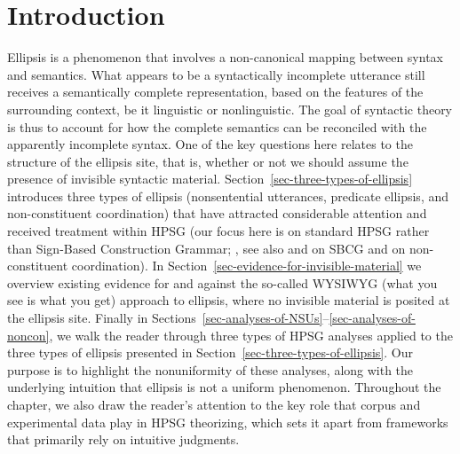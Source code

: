 
\maketitle
\label{chap-ellipsis}



\section{Introduction}
\label{ellipsis-sec-introduction}

Ellipsis is a phenomenon that involves a non-canonical mapping between syntax and semantics. What
appears to be a syntactically incomplete utterance still receives a semantically complete
representation, based on the features of the surrounding context, be it linguistic or
nonlinguistic. The goal of syntactic theory is thus to account for how the complete semantics can be
reconciled with the apparently incomplete syntax. One of the key questions here relates to the
structure of the ellipsis site, that is, whether or not we should assume the presence of invisible
syntactic material. Section~\ref{sec-three-types-of-ellipsis} introduces three types of ellipsis
(nonsentential utterances, predicate ellipsis, and non-constituent coordination) that have attracted
considerable attention and received treatment within HPSG (our focus here is on standard HPSG rather
than Sign-Based Construction Grammar; \citealt{Sag2012}, see also
 and
 on SBCG and
 on non-constituent
coordination).  In Section~\ref{sec-evidence-for-invisible-material} we overview existing evidence
for and against the so-called WYSIWYG (what you see is what you get) approach to ellipsis, where no
invisible material is posited at the ellipsis site. Finally in
Sections~\ref{sec-analyses-of-NSUs}--\ref{sec-analyses-of-noncon}, we walk the reader through three
types of HPSG analyses applied to the three types of ellipsis presented in
Section~\ref{sec-three-types-of-ellipsis}. Our purpose is to highlight the nonuniformity of these
analyses, along with the underlying intuition that ellipsis is not a uniform phenomenon. Throughout
the chapter, we also draw the reader's attention to the key role that corpus and experimental data
play in HPSG theorizing, which sets it apart from frameworks that primarily rely on intuitive
judgments.



